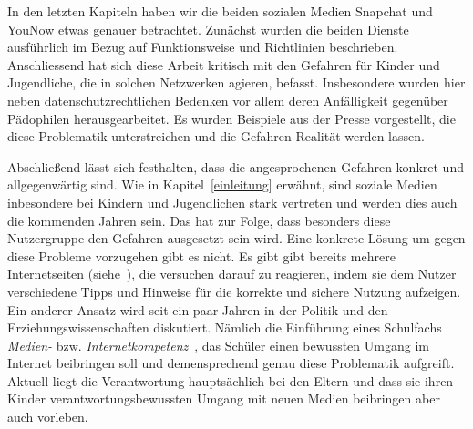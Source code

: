 In den letzten Kapiteln haben wir die beiden sozialen Medien Snapchat und
YouNow etwas genauer betrachtet. Zun\"achst wurden die beiden Dienste
ausf\"uhrlich im Bezug auf Funktionsweise und Richtlinien beschrieben.
Anschliessend hat sich diese Arbeit kritisch mit den Gefahren f\"ur Kinder und
Jugendliche, die in solchen Netzwerken agieren, befasst. Insbesondere wurden
hier neben datenschutzrechtlichen Bedenken vor allem deren Anf\"alligkeit
gegen\"uber P\"adophilen herausgearbeitet. Es wurden Beispiele aus der Presse
vorgestellt, die diese Problematik unterstreichen und die Gefahren Realit\"at
werden lassen.

Abschlie{\ss}end l\"asst sich festhalten, dass die angesprochenen Gefahren
konkret und allgegenw\"artig sind. Wie in Kapitel~\ref{einleitung} erw\"ahnt,
sind soziale Medien inbesondere bei Kindern und Jugendlichen stark vertreten
und werden dies auch die kommenden Jahren sein. Das hat zur Folge, dass
besonders diese Nutzergruppe den Gefahren ausgesetzt sein wird. Eine konkrete
L\"osung um gegen diese Probleme vorzugehen gibt es nicht. Es gibt gibt bereits
mehrere Internetseiten (siehe~\cite{KS15, sc_empfehlung}), die versuchen darauf
zu reagieren, indem sie dem Nutzer verschiedene Tipps und Hinweise f\"ur die
korrekte und sichere Nutzung aufzeigen. Ein anderer Ansatz wird seit ein paar
Jahren in der Politik und den Erziehungswissenschaften diskutiert. N\"amlich
die Einf\"uhrung eines Schulfachs \emph{Medien-} bzw.
\emph{Internetkompetenz}~\cite{tagesspiegel_kompetenz}, das Sch\"uler einen
bewussten Umgang im Internet beibringen soll und demensprechend genau diese
Problematik aufgreift. Aktuell liegt die Verantwortung haupts\"achlich bei den
Eltern und dass sie ihren Kinder verantwortungsbewussten Umgang mit neuen
Medien beibringen aber auch vorleben.
